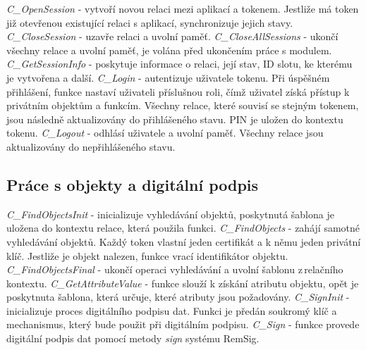 \documentclass[]{fithesis3}
\begin{document}
	\textit{C\_OpenSession} - vytvoří novou relaci mezi aplikací a tokenem. Jestliže má token již 		otevřenou existující relaci s aplikací, synchronizuje jejich stavy.
	\newline
	\newline
	\textit{C\_CloseSession} - uzavře relaci a uvolní paměť.
	\newline
	\newline
	\textit{C\_CloseAllSessions} - ukončí všechny relace a uvolní paměť, je volána před ukončením 	práce s modulem.
	\newline
	\newline
	\textit{C\_GetSessionInfo} - poskytuje informace o relaci, její stav, ID slotu, ke kterému je 			vytvořena a další.
	\newline
	\newline
	\textit{C\_Login} - autentizuje uživatele tokenu. Při úspěšném přihlášení, funkce nastaví 			uživateli příslušnou roli, čímž uživatel získá přístup k privátním objektům a funkcím. Všechny 		relace, které souvisí se stejným tokenem, jsou následně aktualizovány do přihlášeného stavu. 		PIN je uložen do kontextu tokenu.
	\newline
	\newline
	\textit{C\_Logout} - odhlásí uživatele a uvolní paměť. Všechny relace jsou aktualizovány do 		nepřihlášeného stavu.

	\subsection{Práce s objekty a digitální podpis}

	\textit{C\_FindObjectsInit} - inicializuje vyhledávání objektů, poskytnutá šablona je uložena do 	kontextu relace, která použila funkci.
	\newline
	\newline
	\textit{C\_FindObjects} - zahájí samotné vyhledávání objektů. Každý token vlastní jeden 			certifikát a k němu jeden privátní klíč. Jestliže je objekt nalezen, funkce vrací identifikátor 			objektu.
	\newline
	\newline
	\textit{C\_FindObjectsFinal} - ukončí operaci vyhledávání a uvolní šablonu z\,relačního 				kontextu.
	\newline
	\newline
	\textit{C\_GetAttributeValue} - funkce slouží k získání atributu objektu, opět je poskytnuta 			šablona, která určuje, které atributy jsou požadovány. 
	\newline
	\newline
	\textit{C\_SignInit} - inicializuje proces digitálního podpisu dat. Funkci je předán soukromý klíč a 		mechanismus, který bude použit při digitálním podpisu.
	\newline
	\newline
	\textit{C\_Sign} - funkce provede digitální podpis dat pomocí metody \textit{sign} systému 			RemSig.
\end{document}

